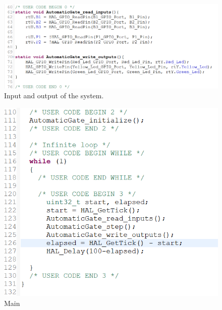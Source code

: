 \documentclass[12pt]{article}
\begin{document}
\begin{figure}[H]
    \hspace{0.72cm}
    \includegraphics[width=1\textwidth]{snippet/input_output.png}
    \caption{Input and output of the system.}
\end{figure}
\begin{figure}[H]
    \hspace{0.9cm}
    \includegraphics[width=1\textwidth]{snippet/main.png}
    \caption{Main}
\end{figure}
\newpage
\end{document}
